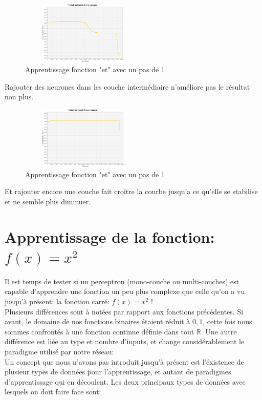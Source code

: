 \documentclass[twoside,openright,a4paper,11pt,french]{article}
\begin{document}
\begin{figure}[ht]
\centering
\includegraphics[width=6cm,height=3cm]{./pics/eq/multi_3_4_def.eps}
\caption{Apprentissage fonction "et" avec un pas de 1}
\end{figure}
\clearpage

Rajouter des neurones dans les couche intermédiaire n'améliore pas le résultat
non plus.

\begin{figure}[ht]
\centering
\includegraphics[width=6cm,height=3cm]{./pics/eq/multi_3_3_3_def.eps}
\caption{Apprentissage fonction "et" avec un pas de 1}
\end{figure}


Et rajouter encore une couche fait croitre la courbe jusqu'a ce qu'elle se
stabilise et ne semble plus diminuer.


\section{Apprentissage de la fonction: $f(x) = x^2$}

Il est temps de tester si un perceptron (mono-couche ou multi-couches) est
capable d'apprendre une fonction un peu plus complexe que celle qu'on a vu jusqu'à présent: 
la fonction carré: $f(x) = x^2$ !\\

Plusieurs différences sont à notées par rapport aux fonctions précédentes.
Si avant, le domaine de nos fonctions binaires étaient réduit à ${0,1}$, cette
fois nous sommes confrontés à une fonction continue définie dans tout $\mathbb{R}$.
Une autre différence est liée au type et nombre d'inputs, et change
considérablement le paradigme utilisé par notre réseau:\\

Un concept que nous n'avons pas introduit jusqu'à présent est l'éxistence de plusieur
types de données pour l'apprentissage, et autant de paradigmes d'apprentissage qui en
découlent. Les deux principaux types de données avec lesquels on doit faire
face sont:
\end{document}
